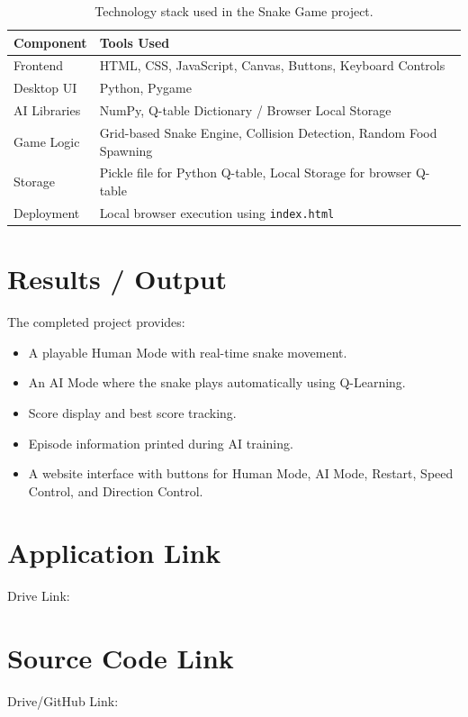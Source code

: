 \documentclass[12pt,a4paper]{article}
\begin{document}
\begin{table}[H]
\centering
\renewcommand{\arraystretch}{1.35}
\begin{tabular}{|p{}|p{}|}
\hline
\textbf{Component} & \textbf{Tools Used} \\
\hline
Frontend & HTML, CSS, JavaScript, Canvas, Buttons, Keyboard Controls \\
\hline
Desktop UI & Python, Pygame \\
\hline
AI Libraries & NumPy, Q-table Dictionary / Browser Local Storage \\
\hline
Game Logic & Grid-based Snake Engine, Collision Detection, Random Food Spawning \\
\hline
Storage & Pickle file for Python Q-table, Local Storage for browser Q-table \\
\hline
Deployment & Local browser execution using \texttt{index.html} \\
\hline
\end{tabular}
\caption{Technology stack used in the Snake Game project.}
\end{table}

\section{Results / Output}

The completed project provides:

\begin{itemize}
    \item A playable Human Mode with real-time snake movement.
    \item An AI Mode where the snake plays automatically using Q-Learning.
    \item Score display and best score tracking.
    \item Episode information printed during AI training.
    \item A website interface with buttons for Human Mode, AI Mode, Restart, Speed Control, and Direction Control.
\end{itemize}

\section{Application Link}

Drive Link: \underline{\hspace{10cm}}

\section{Source Code Link}

Drive/GitHub Link: \underline{\hspace{9cm}}
\end{document}
